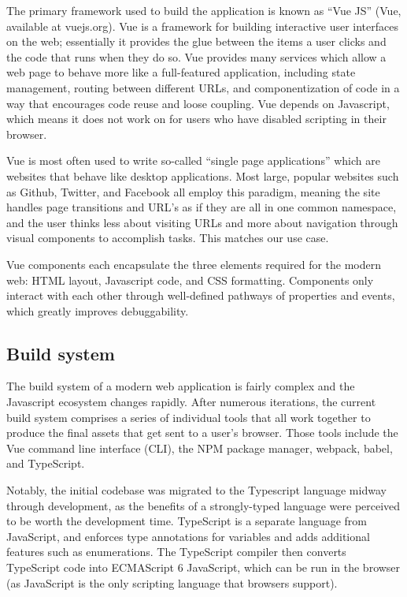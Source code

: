 The primary framework used to build the application is known as ``Vue
JS'' (Vue, available at vuejs.org). Vue is a framework for building
interactive user interfaces on the web; essentially it provides the glue
between the items a user clicks and the code that runs when they do so.
Vue provides many services which allow a web page to behave more like a
full-featured application, including state management, routing between
different URLs, and componentization of code in a way that encourages
code reuse and loose coupling. Vue depends on Javascript, which means it
does not work on for users who have disabled scripting in their browser.

Vue is most often used to write so-called ``single page applications''
which are websites that behave like desktop applications. Most large,
popular websites such as Github, Twitter, and Facebook all employ this
paradigm, meaning the site handles page transitions and URL's as if they
are all in one common namespace, and the user thinks less about visiting
URLs and more about navigation through visual components to accomplish
tasks. This matches our use case.

Vue components each encapsulate the three elements required for the
modern web: HTML layout, Javascript code, and CSS formatting. Components
only interact with each other through well-defined pathways of
properties and events, which greatly improves debuggability.

\hypertarget{build-system}{%
\subsection{Build system}\label{build-system}}

The build system of a modern web application is fairly complex and the
Javascript ecosystem changes rapidly. After numerous iterations, the
current build system comprises a series of individual tools that all
work together to produce the final assets that get sent to a user's
browser. Those tools include the Vue command line interface (CLI), the
NPM package manager, webpack, babel, and TypeScript.

Notably, the initial codebase was migrated to the Typescript language
midway through development, as the benefits of a strongly-typed language
were perceived to be worth the development time. TypeScript is a
separate language from JavaScript, and enforces type annotations for
variables and adds additional features such as enumerations. The
TypeScript compiler then converts TypeScript code into ECMAScript 6
JavaScript, which can be run in the browser (as JavaScript is the only
scripting language that browsers support).

